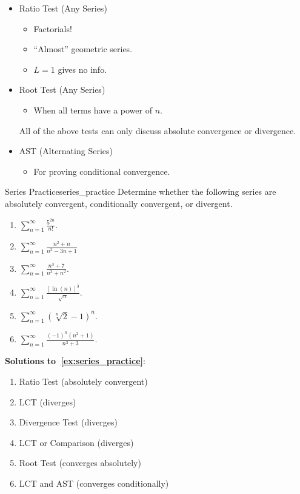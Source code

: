 \begin{itemize}
    \item Ratio Test (Any Series)
          \begin{itemize}
              \item Factorials!
              \item ``Almost'' geometric series.
              \item $ L=1 $ gives no info.
          \end{itemize}
    \item Root Test (Any Series)
          \begin{itemize}
              \item When all terms have a power of $ n $.
          \end{itemize}
          All of the above tests can only discuss absolute convergence or divergence.
    \item AST (Alternating Series)
          \begin{itemize}
              \item For proving conditional convergence.
          \end{itemize}
\end{itemize}

\begin{Exercise}{Series Practice}{series_practice}
    Determine whether the following series are absolutely convergent,
    conditionally convergent, or divergent.
    \begin{enumerate}[label=(\roman*)]
        \item $ \displaystyle \sum\limits_{n=1}^{\infty}\frac{5^{2n}}{n!} $.
        \item $ \displaystyle \sum\limits_{n=1}^{\infty} \frac{n^2+n}{n^3-3n+1} $
        \item $ \displaystyle \sum\limits_{n=1}^{\infty} \frac{n^3+7}{n^3+n^2} $.
        \item $ \displaystyle \sum\limits_{n=1}^{\infty} \frac{\left[ \ln(n) \right]^3}{\sqrt{n}} $.
        \item $ \displaystyle \sum\limits_{n=1}^{\infty} (\sqrt[n]{2}-1)^n $.
        \item $ \displaystyle \sum\limits_{n=1}^{\infty} \frac{(-1)^n(n^2+1)}{n^3+3} $.
    \end{enumerate}
\end{Exercise}
\textbf{Solutions to~\ref{ex:series_practice}}:
\begin{enumerate}[label=(\roman*)]
    \item Ratio Test (absolutely convergent)
    \item LCT (diverges)
    \item Divergence Test (diverges)
    \item LCT or Comparison (diverges)
    \item Root Test (converges absolutely)
    \item LCT and AST (converges conditionally)
\end{enumerate}
